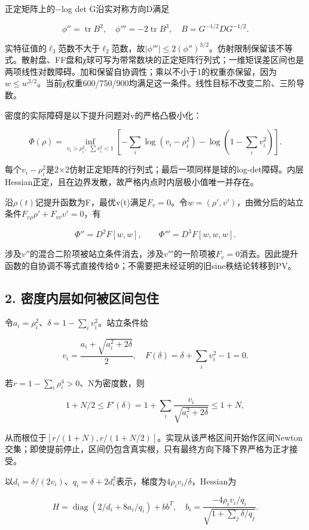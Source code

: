 \documentclass[
  10pt,
  a4paper,
]{article}
\begin{document}
正定矩阵上的−log det G沿实对称方向D满足

\[\phi''=\operatorname{tr}B^2,\quad
\phi'''=-2\operatorname{tr}B^3,\quad B=G^{-1/2}DG^{-1/2}.\]

实特征值的\(\ell_3\)范数不大于\(\ell_2\)范数，故\(|\phi'''|\le2(\phi'')^{3/2}\)。仿射限制保留该不等式。散射盘、FF盘和χ球可写为带常数块的正定矩阵行列式；一维矩误差区间也是两项线性对数障碍。加和保留自协调性；乘以不小于1的权重亦保留，因为\(w\le w^{3/2}\)。当前χ权重600/750/900均满足这一条件。线性目标不改变二阶、三阶导数。

密度的实际障碍是以下提升问题对v的严格凸极小化：

\[\Phi(\rho)=\inf_{v_i>\rho_i^2,\;\sum v_i^2<1}
\left[-\sum_i\log(v_i-\rho_i^2)-\log\left(1-\sum_i v_i^2\right)\right].\]

每个\(v_i-\rho_i^2\)是2×2仿射正定矩阵的行列式；最后一项同样是球的log-det障碍。内层Hessian正定，且在边界发散，故严格内点时内层极小值唯一并存在。

沿\(\rho(t)\)记提升函数为F，最优v(t)满足\(F_v=0\)。令\(w=(\rho',v')\)，由微分后的站立条件\(F_{v\rho}\rho'+F_{vv}v'=0\)，有

\[\Phi''=D^2F[w,w],\qquad \Phi'''=D^3F[w,w,w].\]

涉及\(v''\)的混合二阶项被站立条件消去，涉及\(v'''\)的一阶项被\(F_v=0\)消去。因此提升函数的自协调不等式直接传给Φ；不需要把未经证明的旧sine秩结论转移到PV。

\subsection{2.
密度内层如何被区间包住}\label{ux5bc6ux5ea6ux5185ux5c42ux5982ux4f55ux88abux533aux95f4ux5305ux4f4f}

令\(a_i=\rho_i^2\)、\(\delta=1-\sum_i v_i^2\)。站立条件给

\[v_i=\frac{a_i+\sqrt{a_i^2+2\delta}}2,\quad
F(\delta)=\delta+\sum_i v_i^2-1=0.\]

若\(r=1-\sum_i\rho_i^4>0\)、N为密度数，则

\[1+N/2\le F'(\delta)=1+\sum_i\frac{v_i}{\sqrt{a_i^2+2\delta}}\le1+N,\]

从而根位于\([r/(1+N),r/(1+N/2)]\)。实现从该严格区间开始作区间Newton交集；即使提前停止，区间仍包含真实根，只有最终方向下降下界严格为正才接受。

以\(d_i=\delta/(2v_i)\)、\(q_i=\delta+2d_i^2\)表示，梯度为\(4\rho_iv_i/\delta\)，Hessian为

\[H=\operatorname{diag}\left(2/d_i+8a_i/q_i\right)+bb^T,
\quad b_i=\frac{-4\rho_iv_i/q_i}{\sqrt{1+\sum_j\delta/q_j}}.\]
\end{document}
